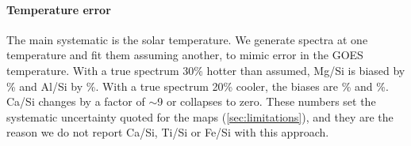 \paragraph{Temperature error} The main systematic is the solar temperature. We generate spectra at one temperature and fit them assuming another, to mimic error in the GOES temperature. With a true spectrum 30\% hotter than assumed, Mg/Si is biased by \SynHotMg\% and Al/Si by \SynHotAl\%. With a true spectrum 20\% cooler, the biases are \SynColdMg\% and \SynColdAl\%. Ca/Si changes by a factor of $\sim$9 or collapses to zero. These numbers set the systematic uncertainty quoted for the maps (\cref{sec:limitations}), and they are the reason we do not report Ca/Si, Ti/Si or Fe/Si with this approach.

\begin{table}[!tp]
\centering
\caption{Synthetic recovery at a \SI{5}{MK} solar temperature (80 spectra per level): median relative bias / robust relative scatter (\%), and pull width.}\label{tab:synthetic}

\end{table}
